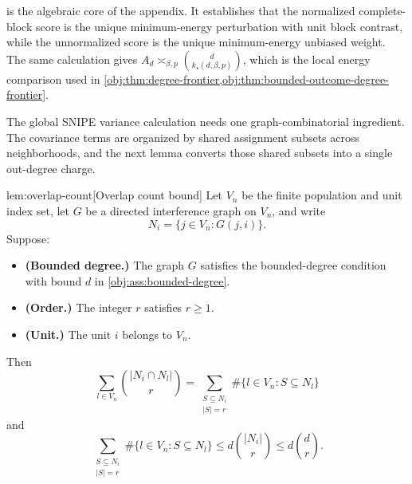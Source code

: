 \documentclass[11pt]{article}
\begin{document}
 is the algebraic core of the appendix. It establishes that the normalized complete-block score is the unique minimum-energy perturbation with unit block contrast, while the unnormalized score is the unique minimum-energy unbiased weight. The same calculation gives \(A_d\asymp_{\beta,p}\binom d{k_\star(d,\beta,p)}\), which is the local energy comparison used in \cref{obj:thm:degree-frontier,obj:thm:bounded-outcome-degree-frontier}.

The global SNIPE variance calculation needs one graph-combinatorial ingredient. The covariance terms are organized by shared assignment subsets across neighborhoods, and the next lemma converts those shared subsets into a single out-degree charge.

\begin{lemmav}{lem:overlap-count}[Overlap count bound]
Let \(V_n\) be the finite population and unit index set, let \(G\) be a directed interference graph on \(V_n\), and write
\[
N_i=\{j\in V_n:G(j,i)\}.
\]
Suppose:
\begin{itemize}
\item \textbf{(Bounded degree.)} The graph \(G\) satisfies the bounded-degree condition with bound \(d\) in \cref{obj:ass:bounded-degree}.
\item \textbf{(Order.)} The integer \(r\) satisfies \(r\ge 1\).
\item \textbf{(Unit.)} The unit \(i\) belongs to \(V_n\).
\end{itemize}
Then
\[
\sum_{l\in V_n}\binom{|N_i\cap N_l|}{r}
=
\sum_{\substack{S\subseteq N_i\\ |S|=r}}
\#\{l\in V_n:S\subseteq N_l\}
\]
and
\[
\sum_{\substack{S\subseteq N_i\\ |S|=r}}
\#\{l\in V_n:S\subseteq N_l\}
\le
d\binom{|N_i|}{r}
\le
d\binom{d}{r}.
\]
\end{lemmav}
\end{document}
